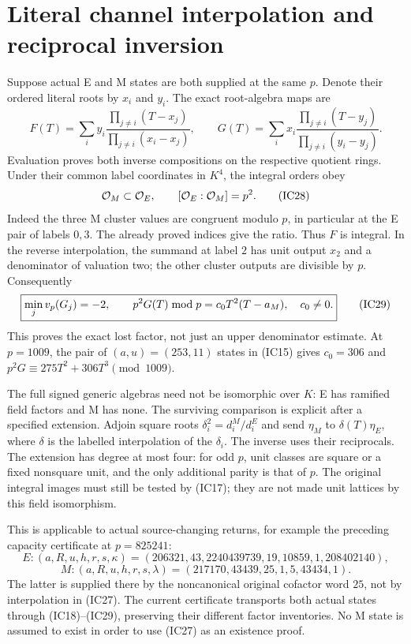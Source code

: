 \section{Literal channel interpolation and reciprocal inversion}
Suppose actual E and M states are both supplied at the same $p$. Denote their
ordered literal roots by $x_i$ and $y_i$. The exact root-algebra maps are
\[
 F(T)=\sum_i y_i\frac{\prod_{j\ne i}(T-x_j)}{\prod_{j\ne i}(x_i-x_j)},
 \qquad
 G(T)=\sum_i x_i\frac{\prod_{j\ne i}(T-y_j)}{\prod_{j\ne i}(y_i-y_j)}.
                                                               \tag{IC27}
\]
Evaluation proves both inverse compositions on the respective quotient rings.
Under their common label coordinates in $K^4$, the integral orders obey
\[
 \mathcal O_M\subset\mathcal O_E,
 \qquad[\mathcal O_E:\mathcal O_M]=p^2.                              \tag{IC28}
\]
Indeed the three M cluster values are congruent modulo $p$, in particular at
the E pair of labels $0,3$. The already proved indices give the ratio.
Thus $F$ is integral. In the reverse interpolation, the summand at label $2$
has unit output $x_2$ and a denominator of valuation two; the other cluster
outputs are divisible by $p$. Consequently
\[
 \boxed{\min_jv_p(G_j)=-2,\qquad
 p^2G(T)\bmod p=c_0T^2(T-a_M),\quad c_0\ne0.}           \tag{IC29}
\]
This proves the exact lost factor, not just an upper denominator estimate.
At $p=1009$, the pair of $(a,u)=(253,11)$ states in (IC15) gives
$c_0=306$ and $p^2G\equiv275T^2+306T^3\pmod{1009}$.

The full signed generic algebras need not be isomorphic over $K$: E has ramified
field factors and M has none. The surviving comparison is explicit after a
specified extension. Adjoin square roots $\delta_i^2=d_i^M/d_i^E$ and send
$\eta_M$ to $\delta(T)\eta_E$, where $\delta$ is the labelled interpolation
of the $\delta_i$. The inverse uses their reciprocals. The extension has degree
at most four: for odd $p$, unit classes are square or a fixed nonsquare unit,
and the only additional parity is that of $p$. The original integral images
must still be tested by (IC17); they are not made unit lattices by this field
isomorphism.

This is applicable to actual source-changing returns, for example the preceding
capacity certificate \cite[sharp finite repair]{Capacity} at $p=825241$:
\[
 E:(a,R,u,h,r,s,\kappa)=(206321,43,2240439739,19,10859,1,208402140),
\]
\[
 M:(a,R,u,h,r,s,\lambda)=(217170,43439,25,1,5,43434,1).
\]
The latter is supplied there by the noncanonical original cofactor word $25$,
not by interpolation in (IC27). The current certificate transports both actual
states through (IC18)--(IC29), preserving their different factor inventories.
No M state is assumed to exist in order to use (IC27) as an existence proof.

